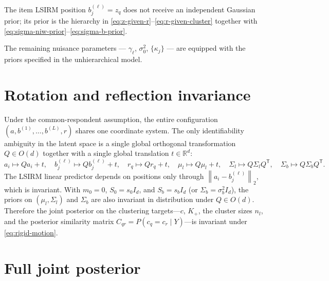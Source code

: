 \documentclass[11pt]{article}
\newcommand{\R}{\mathbb R}
\newcommand{\norm}[1]{\left\lVert #1 \right\rVert}
\newcommand{\trans}{^{\mathsf T}}
\begin{document}
The item LSIRM position $b_j^{(\ell)}=z_q$ does not receive an
independent Gaussian prior; its prior is the hierarchy in
\eqref{eq:z-given-r}--\eqref{eq:r-given-cluster} together with
\eqref{eq:sigma-niw-prior}--\eqref{eq:sigma-b-prior}.

The remaining nuisance parameters --- $\gamma_\ell$, $\sigma_0^2$,
$\{\kappa_j\}$ --- are equipped with the priors specified in the
unhierarchical model.

\section{Rotation and reflection invariance}
\label{sec:layer-comparability}

Under the common-respondent assumption, the entire configuration
$(a,b^{(1)},\dots,b^{(L)},r)$ shares one coordinate system.  The only
identifiability ambiguity in the latent space is a single global
orthogonal transformation $Q\in O(d)$ together with a single global
translation $t\in\R^d$:
\begin{equation}
    a_i\mapsto Qa_i+t,
    \quad
    b_j^{(\ell)}\mapsto Qb_j^{(\ell)}+t,
    \quad
    r_q\mapsto Qr_q+t,
    \quad
    \mu_l\mapsto Q\mu_l+t,
    \quad
    \Sigma_l\mapsto Q\Sigma_l Q\trans,
    \quad
    \Sigma_b\mapsto Q\Sigma_b Q\trans.
    \label{eq:rigid-motion}
\end{equation}
The LSIRM linear predictor depends on positions only through
$\norm{a_i-b_j^{(\ell)}}_2$, which is invariant.  With $m_0=0$,
$S_0=s_0 I_d$, and $S_b=s_b I_d$ (or $\Sigma_b=\sigma_b^2 I_d$), the priors
on $(\mu_l,\Sigma_l)$ and $\Sigma_b$ are also invariant in distribution
under $Q\in O(d)$.  Therefore the joint posterior on the clustering
targets---$c$, $K_+$, the cluster sizes $n_l$, and the posterior
similarity matrix $C_{qr}=P(c_q=c_r\mid Y)$---is invariant under
\eqref{eq:rigid-motion}.

\section{Full joint posterior}
\end{document}
